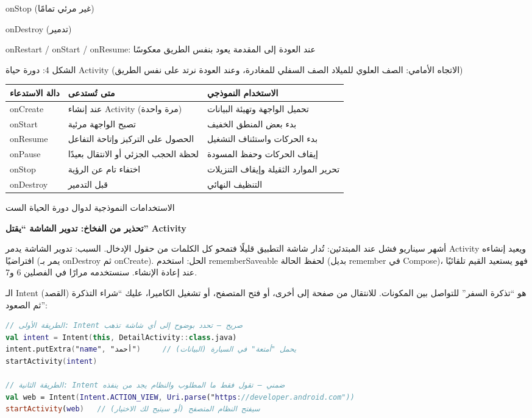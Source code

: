 onStop (غير مرئي تمامًا)

onDestroy (تدمير)

onRestart / onStart / onResume: عند العودة إلى المقدمة يعود بنفس الطريق معكوسًا

\begin{center}\small\color{gray}الشكل 4: دورة حياة Activity (الاتجاه الأمامي: الصف العلوي للميلاد الصف السفلي للمغادرة، وعند العودة نرتد على نفس الطريق)\end{center}

\begin{center}
\begin{tabularx}{\linewidth}{|X|X|X|}
\hline
\textbf{دالة الاستدعاء} & \textbf{متى تُستدعى} & \textbf{الاستخدام النموذجي} \tabularnewline
\hline
onCreate & عند إنشاء Activity (مرة واحدة) & تحميل الواجهة وتهيئة البيانات \tabularnewline
onStart & تصبح الواجهة مرئية & بدء بعض المنطق الخفيف \tabularnewline
onResume & الحصول على التركيز وإتاحة التفاعل & بدء الحركات واستئناف التشغيل \tabularnewline
onPause & لحظة الحجب الجزئي أو الانتقال بعيدًا & إيقاف الحركات وحفظ المسودة \tabularnewline
onStop & اختفاء تام عن الرؤية & تحرير الموارد الثقيلة وإيقاف التنزيلات \tabularnewline
onDestroy & قبل التدمير & التنظيف النهائي \tabularnewline
\hline
\end{tabularx}
\end{center}

\begin{center}\small\color{gray}الاستخدامات النموذجية لدوال دورة الحياة الست\end{center}

\textbf{تحذير من الفخاخ: تدوير الشاشة “يقتل” Activity}\par

أشهر سيناريو فشل عند المبتدئين: تُدار شاشة التطبيق قليلًا فتمحو كل الكلمات من حقول الإدخال. السبب: تدوير الشاشة يدمر Activity ويعيد إنشاءه افتراضيًا (يمر بـ onDestroy ثم onCreate). الحل: استخدم rememberSaveable لحفظ الحالة (بديل remember في Compose)، فهو يستعيد القيم تلقائيًا عند إعادة الإنشاء. سنستخدمه مرارًا في الفصلين 6 و7.


الـ Intent (القصد) هو “تذكرة السفر” للتواصل بين المكونات. للانتقال من صفحة إلى أخرى، أو فتح المتصفح، أو تشغيل الكاميرا، عليك “شراء التذكرة ثم الصعود”:

\begin{lstlisting}[language=Kotlin]
// الطريقة الأولى: Intent صريح — تحدد بوضوح إلى أي شاشة تذهب
val intent = Intent(this, DetailActivity::class.java)
intent.putExtra("name", "أحمد")     // يحمل "أمتعة" في السيارة (البيانات)
startActivity(intent)

// الطريقة الثانية: Intent ضمني — تقول فقط ما المطلوب والنظام يجد من ينفذه
val web = Intent(Intent.ACTION_VIEW, Uri.parse("https://developer.android.com"))
startActivity(web)   // سيفتح النظام المتصفح (أو سيتيح لك الاختيار)
\end{lstlisting}

